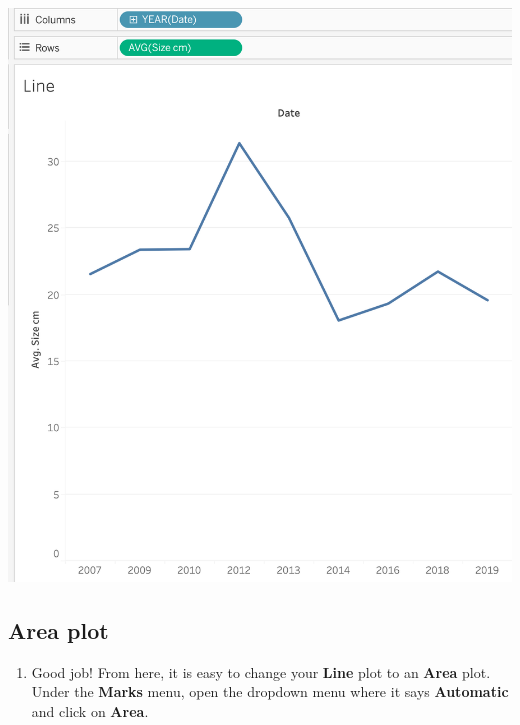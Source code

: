 \documentclass[
]{book}
\providecommand{\tightlist}{%
  \setlength{\itemsep}{0pt}\setlength{\parskip}{0pt}}
\begin{document}
\includegraphics{images/M3S2_Line-Plot.png}

\hypertarget{area-plot}{%
\subsection{Area plot}\label{area-plot}}

\begin{enumerate}
\def\labelenumi{\arabic{enumi}.}
\tightlist
\item
  Good job! From here, it is easy to change your \textbf{Line} plot to an \textbf{Area} plot. Under the \textbf{Marks} menu, open the dropdown menu where it says \textbf{Automatic} and click on \textbf{Area}.
\end{enumerate}
\end{document}
